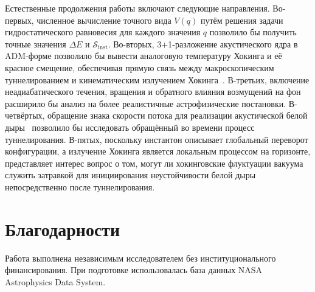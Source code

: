 \documentclass[12pt,a4paper,preprint]{elsarticle}
\begin{document}
        Естественные продолжения работы включают следующие направления. Во-первых, численное вычисление точного вида $V(q)$ путём решения задачи гидростатического равновесия для каждого значения $q$ позволило бы получить точные значения $\Delta E$ и $\mathcal{S}_{\mathrm{inst}}$. Во-вторых, 3+1-разложение акустического ядра в ADM-форме позволило бы вывести аналоговую температуру Хокинга и её красное смещение, обеспечивая прямую связь между макроскопическим туннелированием и кинематическим излучением Хокинга~\cite{VolovikGE_PainleveGullstrandCoordinatesForSchwarzschildDeSitterSpacetime_2023}. В-третьих, включение неадиабатического течения, вращения и обратного влияния возмущений на фон расширило бы анализ на более реалистичные астрофизические постановки. В-четвёртых, обращение знака скорости потока для реализации акустической белой дыры~\cite{SemyannikovAV_GlobalAcousticGeometryOfMichelFlowInPainleveGullstrandCoordinates_2026} позволило бы исследовать обращённый во времени процесс туннелирования. В-пятых, поскольку инстантон описывает глобальный переворот конфигурации, а излучение Хокинга является локальным процессом на горизонте, представляет интерес вопрос о том, могут ли хокинговские флуктуации вакуума служить затравкой для инициирования неустойчивости белой дыры непосредственно после туннелирования.

    \section*{Благодарности}
        Работа выполнена независимым исследователем без институционального финансирования. При подготовке использовалась база данных NASA Astrophysics Data System.

    
    
\end{document}
